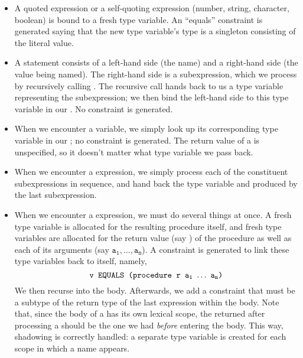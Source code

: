\documentclass[a4paper]{article}
\begin{document}
\newcommand{\lra}{\longrightarrow}
\begin{itemize}
  \item A quoted expression or a self-quoting expression (number, string,
    character, boolean) is bound to a fresh type variable.  An ``equals''
    constraint is generated saying that the new type variable's type is a
    singleton consisting of the literal value.

  \item A  statement consists of a left-hand side (the name) and a
    right-hand side (the value being named).  The right-hand side is a
    subexpression, which we process by recursively calling
    .  The recursive call hands back to us a type
    variable representing the subexpression; we then bind the left-hand side to
    this type variable in our .  No constraint is generated.

  \item When we encounter a variable, we simply look up its corresponding type
    variable in our ; no constraint is generated.  The return value of
    a  is unspecified, so it doesn't matter what type variable we pass
    back.

  \item When we encounter a  expression, we simply process each of the
    constituent subexpressions in sequence, and hand back the type variable and
     produced by the last subexpression.

  \item When we encounter a  expression, we must do several things at
    once.  A fresh type variable  is allocated for the resulting procedure
    itself, and fresh type variables are allocated for the return value (say
    ) of the procedure as well as each of its arguments (say $\mathtt{a_1,
    \ldots, a_n}$).  A constraint is generated to link these type variables back
    to  itself, namely,
    \[ \T{v EQUALS (procedure r }\mathtt{a_1\ \ldots\ a_n}\T{)} \]
    We then recurse into the body.  Afterwards, we add a constraint that 
    must be a subtype of the return type of the last expression within the body.
    Note that, since the body of a  has its own lexical scope, the
     returned after processing a  should be the one we had
    {\em before} entering the body.  This way, shadowing is correctly handled:
    a separate type variable is created for each scope in which a name appears.


\end{itemize}
\end{document}
